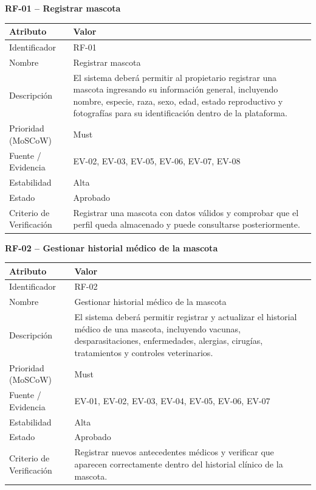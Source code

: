 \documentclass[journal,onecolumn]{IEEEtran}
\begin{document}
	\textbf{RF-01 -- Registrar mascota}
	\begin{table}[H]
		\centering\small
		\begin{tabularx}{\linewidth}{|l|X|}
			\hline
			\textbf{Atributo} & \textbf{Valor} \\ \hline
			Identificador & RF-01 \\ \hline
			Nombre & Registrar mascota \\ \hline
			Descripción & El sistema deberá permitir al propietario registrar una mascota ingresando su información general, incluyendo nombre, especie, raza, sexo, edad, estado reproductivo y fotografías para su identificación dentro de la plataforma. \\ \hline
			Prioridad (MoSCoW) & Must \\ \hline
			Fuente / Evidencia & EV-02, EV-03, EV-05, EV-06, EV-07, EV-08 \\ \hline
			Estabilidad & Alta \\ \hline
			Estado & Aprobado \\ \hline
			Criterio de Verificación & Registrar una mascota con datos válidos y comprobar que el perfil queda almacenado y puede consultarse posteriormente. \\ \hline
		\end{tabularx}
	\end{table}
	
	\textbf{RF-02 -- Gestionar historial médico de la mascota}
	\begin{table}[H]
		\centering\small
		\begin{tabularx}{\linewidth}{|l|X|}
			\hline
			\textbf{Atributo} & \textbf{Valor} \\ \hline
			Identificador & RF-02 \\ \hline
			Nombre & Gestionar historial médico de la mascota \\ \hline
			Descripción & El sistema deberá permitir registrar y actualizar el historial médico de una mascota, incluyendo vacunas, desparasitaciones, enfermedades, alergias, cirugías, tratamientos y controles veterinarios. \\ \hline
			Prioridad (MoSCoW) & Must \\ \hline
			Fuente / Evidencia & EV-01, EV-02, EV-03, EV-04, EV-05, EV-06, EV-07 \\ \hline
			Estabilidad & Alta \\ \hline
			Estado & Aprobado \\ \hline
			Criterio de Verificación & Registrar nuevos antecedentes médicos y verificar que aparecen correctamente dentro del historial clínico de la mascota. \\ \hline
		\end{tabularx}
	\end{table}
	
\end{document}
